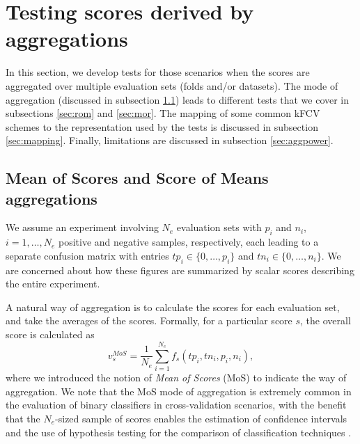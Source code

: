 \documentclass[3p, times]{elsarticle}
\begin{document}
\section{Testing scores derived by aggregations}
\label{sec:agg}

In this section, we develop tests for those scenarios when the scores are aggregated over multiple evaluation sets (folds and/or datasets). 
The mode of aggregation (discussed in subsection \ref{sec:rommor}) leads to different tests that we cover in subsections \ref{sec:rom} and \ref{sec:mor}. 
The mapping of some common kFCV schemes to the representation used by the tests is discussed in subsection \ref{sec:mapping}. {\color{blue} Finally, limitations are discussed in subsection \ref{sec:aggpower}.}

\subsection{Mean of Scores and Score of Means aggregations}
\label{sec:rommor}

We assume an experiment involving $N_e$ evaluation sets with $p_i$ and $n_i$, $i=1,\dots,N_e$ positive and negative samples, respectively, each leading to a separate confusion matrix with entries $tp_i \in\lbrace 0, \dots, p_i\rbrace$ and $tn_i\in\lbrace 0, \dots, n_i\rbrace$. We are concerned about how these figures are summarized by scalar scores describing the entire experiment. 

A natural way of aggregation is to calculate the scores for each evaluation set, and take the averages of the scores. Formally, for a particular score $s$, the overall score is calculated as
\begin{equation}
\label{estmor}
v_s^{MoS} = \dfrac{1}{N_e}\sum\limits_{i=1}^{N_e} f_s(tp_{i}, tn_{i}, p_{i}, n_{i}),
\end{equation}
where we introduced the notion of \emph{Mean of Scores} (MoS) to indicate the way of aggregation. We note that the MoS mode of aggregation is extremely common in the evaluation of binary classifiers in cross-validation scenarios, with the benefit that the $N_e$-sized sample of scores enables the estimation of confidence intervals \cite{morex2} and the use of  hypothesis testing for the comparison of classification techniques \cite{morex0}.
\end{document}
